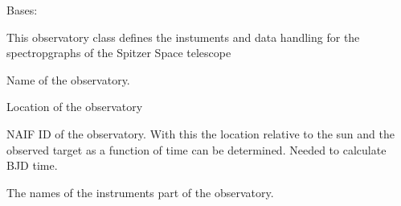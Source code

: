 \documentclass[a4paper,10pt,english]{sphinxmanual}
\begin{document}

\begin{fulllineitems}
\label{\detokenize{cascade.instruments:cascade.instruments.instruments.Spitzer}}
Bases: {\hyperref[\detokenize{cascade.instruments:cascade.instruments.instruments.ObservatoryBase}]{}}

This observatory class defines the instuments and data handling for the
spectropgraphs of the Spitzer Space telescope

\begin{fulllineitems}
\label{\detokenize{cascade.instruments:cascade.instruments.instruments.Spitzer.name}}
Name of the observatory.

\end{fulllineitems}


\begin{fulllineitems}
\label{\detokenize{cascade.instruments:cascade.instruments.instruments.Spitzer.location}}
Location of the observatory

\end{fulllineitems}


\begin{fulllineitems}
\label{\detokenize{cascade.instruments:cascade.instruments.instruments.Spitzer.NAIF_ID}}
NAIF ID of the observatory. With this the location relative to the
sun and the observed target as a function of time can be determined.
Needed to calculate BJD time.

\end{fulllineitems}


\begin{fulllineitems}
\label{\detokenize{cascade.instruments:cascade.instruments.instruments.Spitzer.observatory_instruments}}
The names of the instruments part of the observatory.

\end{fulllineitems}


\end{fulllineitems}
\end{document}
